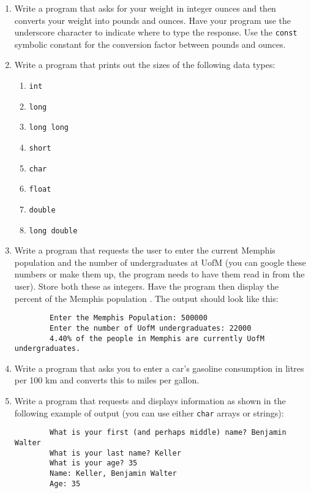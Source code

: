 \documentclass[11pt]{article}
\begin{document}
\begin{enumerate}
    \item Write a program that asks for your weight in integer ounces and then
        converts your weight into pounds and ounces.  Have your program use the
        underscore character to indicate where to type the response. Use the
        \texttt{const} symbolic constant for the conversion factor between
        pounds and ounces.
    \item Write a program that prints out the sizes of the following data types:
        \begin{enumerate}
            \item \texttt{int}
            \item \texttt{long}
            \item \texttt{long long}
            \item \texttt{short}
            \item \texttt{char}
            \item \texttt{float}
            \item \texttt{double}
            \item \texttt{long double}
        \end{enumerate}
    \item Write a program that requests the user to enter the current Memphis
        population and the number of undergraduates at UofM (you can google
        these numbers or make them up, the program needs to have them read in
        from the user).  Store both these as integers.  Have the
        program then display the percent of the Memphis population .  The output
        should look like this:
        \begin{verbatim}
        Enter the Memphis Population: 500000
        Enter the number of UofM undergraduates: 22000
        4.40% of the people in Memphis are currently UofM undergraduates.
        \end{verbatim}
    \item Write a program that asks you to enter a car's gasoline consumption in
        litres per 100 km and converts this to miles per gallon.

    \item Write a program that requests and displays information as shown in the
        following example of output (you can use either \texttt{char} arrays or
        strings):
        \begin{verbatim}
        What is your first (and perhaps middle) name? Benjamin Walter
        What is your last name? Keller 
        What is your age? 35
        Name: Keller, Benjamin Walter
        Age: 35
        \end{verbatim}
\end{enumerate}
\end{document}
